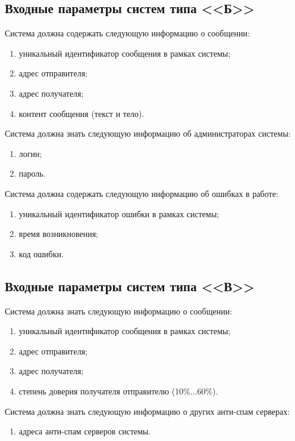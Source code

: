 \subsection{Входные параметры систем типа <<Б>>}

Система должна содержать следующую информацию о сообщении:
\begin{enumerate}
	\item уникальный идентификатор сообщения в рамках системы;
	\item адрес отправителя;
	\item адрес получателя;
	\item контент сообщения (текст и тело).
\end{enumerate}

Система должна знать следующую информацию об администраторах системы:
\begin{enumerate}
	\item логин;
	\item пароль.
\end{enumerate}

Система должна содержать следующую информацию об ошибках в работе:
\begin{enumerate}
	\item уникальный идентификатор ошибки в рамках системы;
	\item время возникновения;
	\item код ошибки.
\end{enumerate}

\subsection{Входные параметры систем типа <<В>>}
Система должна знать следующую информацию о сообщении:
\begin{enumerate}
	\item уникальный идентификатор сообщения в рамках системы;
	\item адрес отправителя;
	\item адрес получателя;
	\item степень доверия получателя отправителю (10\%...60\%).
\end{enumerate}

Система должна знать следующую информацию о других анти-спам серверах:
\begin{enumerate}
	\item адреса анти-спам серверов системы.
\end{enumerate}

